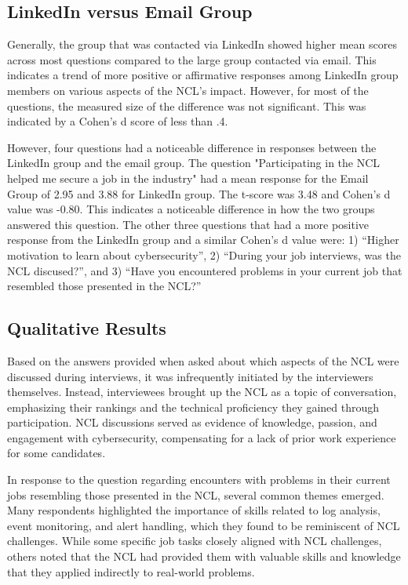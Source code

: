 \documentclass{article}
\begin{document}
\subsection{LinkedIn versus Email Group}

Generally, the group that was contacted via LinkedIn showed higher mean scores across most questions compared to the large group contacted via email. This indicates a trend of more positive or affirmative responses among LinkedIn group members on various aspects of the NCL's impact. However, for most of the questions, the measured size of the difference was not significant. This was indicated by a Cohen’s d score of less than .4.

However, four questions had a noticeable difference in responses between the LinkedIn group and the email group. The question "Participating in the NCL helped me secure a job in the industry" had a mean response for the Email Group of 2.95 and 3.88 for LinkedIn group. The t-score was 3.48 and Cohen's d value was -0.80. This indicates a noticeable difference in how the two groups answered this question. The other three questions that had a more positive response from the LinkedIn group and a similar Cohen’s d value were: 1) ``Higher motivation to learn about cybersecurity'', 2) ``During your job interviews, was the NCL discused?'', and 3) ``Have you encountered problems in your current job that resembled those presented in the NCL?''

\subsection{Qualitative Results}

Based on the answers provided when asked about which aspects of the NCL were discussed during interviews, it was infrequently initiated by the interviewers themselves. Instead, interviewees brought up the NCL as a topic of conversation, emphasizing their rankings and the technical proficiency they gained through participation. NCL discussions served as evidence of knowledge, passion, and engagement with cybersecurity, compensating for a lack of prior work experience for some candidates.

In response to the question regarding encounters with problems in their current jobs resembling those presented in the NCL, several common themes emerged. Many respondents highlighted the importance of skills related to log analysis, event monitoring, and alert handling, which they found to be reminiscent of NCL challenges. While some specific job tasks closely aligned with NCL challenges, others noted that the NCL had provided them with valuable skills and knowledge that they applied indirectly to real-world problems.
\end{document}
